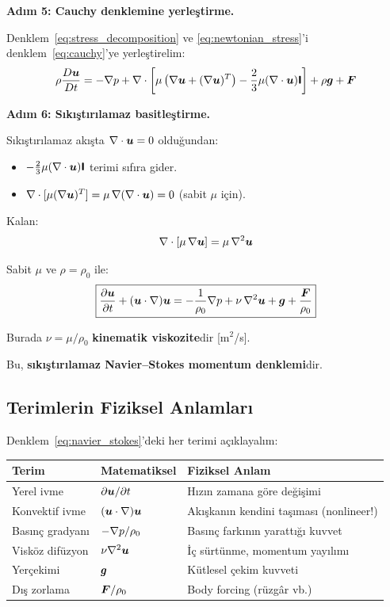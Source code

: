 \textbf{Adım 5: Cauchy denklemine yerleştirme.}

Denklem~\eqref{eq:stress_decomposition} ve \eqref{eq:newtonian_stress}'i denklem~\eqref{eq:cauchy}'ye yerleştirelim:
\begin{equation}
    \rho \frac{D \bm{u}}{Dt} = -\nabla p + \nabla \cdot\left[\mu\left(\nabla\bm{u} + (\nabla\bm{u})^T\right) - \frac{2}{3}\mu(\nabla \cdot\bm{u})\bm{\mathsf{I}}\right] + \rho\bm{g} + \bm{F}
\end{equation}

\textbf{Adım 6: Sıkıştırılamaz basitleştirme.}

Sıkıştırılamaz akışta $\nabla \cdot\bm{u} = 0$ olduğundan:
\begin{itemize}
    \item $-\frac{2}{3}\mu(\nabla \cdot\bm{u})\bm{\mathsf{I}}$ terimi sıfıra gider.
    \item $\nabla \cdot[\mu(\nabla\bm{u})^T] = \mu\,\nabla(\nabla \cdot\bm{u}) = 0$ (sabit $\mu$ için).
\end{itemize}

Kalan:
\begin{equation}
    \nabla \cdot[\mu\,\nabla\bm{u}] = \mu\,\nabla^2\bm{u}
\end{equation}

Sabit $\mu$ ve $\rho = \rho_0$ ile:
\begin{equation}
    \boxed{\frac{\partial \bm{u}}{\partial t} + (\bm{u}\cdot\nabla)\bm{u} = -\frac{1}{\rho_0}\nabla p + \nu\,\nabla^2\bm{u} + \bm{g} + \frac{\bm{F}}{\rho_0}}
    \label{eq:navier_stokes}
\end{equation}

Burada $\nu = \mu/\rho_0$ \textbf{kinematik viskozite}dir [m$^2$/s].

Bu, \textbf{sıkıştırılamaz Navier--Stokes momentum denklemi}dir.

\subsection{Terimlerin Fiziksel Anlamları}

Denklem~\eqref{eq:navier_stokes}'deki her terimi açıklayalım:

\begin{center}
\begin{tabular}{lll}
\toprule
\textbf{Terim} & \textbf{Matematiksel} & \textbf{Fiziksel Anlam} \\
\midrule
Yerel ivme & $\partial\bm{u}/\partial t$ & Hızın zamana göre değişimi \\
Konvektif ivme & $(\bm{u}\cdot\nabla)\bm{u}$ & Akışkanın kendini taşıması (nonlineer!) \\
Basınç gradyanı & $-\nabla p/\rho_0$ & Basınç farkının yarattığı kuvvet \\
Visköz difüzyon & $\nu\nabla^2\bm{u}$ & İç sürtünme, momentum yayılımı \\
Yerçekimi & $\bm{g}$ & Kütlesel çekim kuvveti \\
Dış zorlama & $\bm{F}/\rho_0$ & Body forcing (rüzgâr vb.) \\
\bottomrule
\end{tabular}
\end{center}

